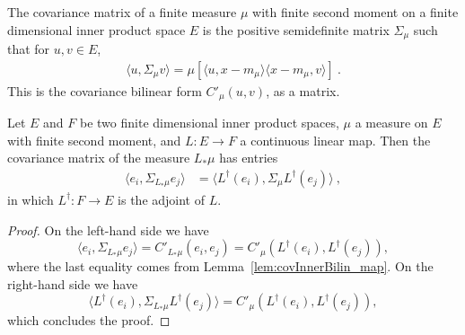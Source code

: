 \begin{definition}\label{def:covMatrix}
The covariance matrix of a finite measure $\mu$ with finite second moment on a finite dimensional inner product space $E$ is the positive semidefinite matrix $\Sigma_\mu$ such that for $u, v \in E$,
\begin{align*}
  \langle u, \Sigma_\mu v\rangle = \mu[\langle u, x - m_\mu \rangle \langle x - m_\mu, v \rangle] \: .
\end{align*}
This is the covariance bilinear form $C'_\mu(u, v)$, as a matrix.
\end{definition}


\begin{lemma}\label{lem:covMatrix_map}
  \leanok
Let $E$ and $F$ be two finite dimensional inner product spaces, $\mu$ a measure on $E$ with finite second moment, and $L : E \to F$ a continuous linear map.
Then the covariance matrix of the measure $L_*\mu$ has entries
\begin{align*}
  \langle e_i, \Sigma_{L_*\mu} e_j\rangle
  &= \langle L^\dagger(e_i), \Sigma_\mu L^\dagger(e_j)\rangle
  \: ,
\end{align*}
in which $L^\dagger : F \to E$ is the adjoint of $L$.
\end{lemma}

\begin{proof}\leanok
  On the left-hand side we have
  $$\langle e_i, \Sigma_{L_*\mu} e_j\rangle = C'_{L_*\mu}(e_i, e_j) = C'_\mu(L^\dagger(e_i), L^\dagger(e_j)),$$
  where the last equality comes from Lemma~\ref{lem:covInnerBilin_map}. On the right-hand side we have
  $$\langle L^\dagger(e_i), \Sigma_{L_*\mu} L^\dagger(e_j)\rangle = C'_\mu(L^\dagger(e_i), L^\dagger(e_j)),$$
  which concludes the proof.
\end{proof}
